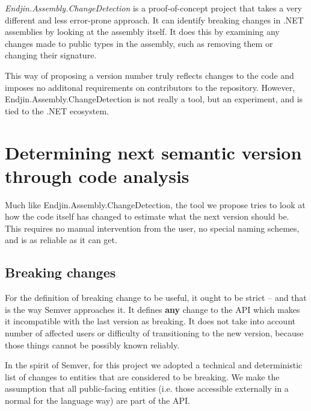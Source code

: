 \documentclass{l4proj}
\begin{document}
\textit{Endjin.Assembly.ChangeDetection}\cite{Endjin} is a
proof-of-concept project that takes a very different and less
error-prone approach. It can identify breaking changes in .NET
assemblies by looking at the assembly itself. It does this
by examining any changes made to public types in the assembly, such as
removing them or changing their signature.

This way of proposing a version number truly reflects changes to
the code and imposes no additonal requirements on contributors to
the repository. However, Endjin.Assembly.ChangeDetection is not really
a tool, but an experiment, and is tied to the .NET ecosystem.

\section{Determining next semantic version through code analysis}

Much like Endjin.Assembly.ChangeDetection, the tool we propose tries
to look at how the code itself has changed to estimate what the next
version should be. This requires no manual intervention from the user,
no special naming schemes, and is as reliable as it can get.


\subsection{Breaking changes}

For the definition of breaking change to be useful, it ought to be
strict -- and that is the way Semver approaches it. It defines
\textbf{any} change to the API which makes it incompatible with the
last version as breaking. It does not take into account number of
affected users or difficulty of transitioning to the new version,
because those things cannot be possibly known reliably.

In the spirit of Semver, for this project we adopted a technical and
deterministic list of changes to entities that are considered
to be breaking. We make the assumption that all public-facing entities
(i.e. those accessible externally in a normal for the language way)
are part of the API.
\end{document}
